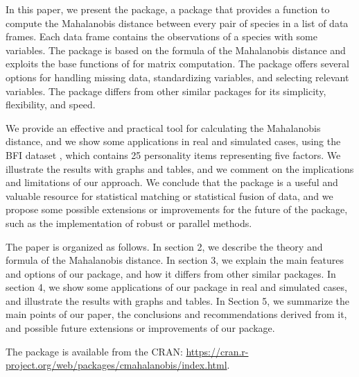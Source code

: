 \documentclass[article]{jss}
\begin{document}
In this paper, we present the  package, a  package that provides a function to compute the Mahalanobis distance between every pair of species in a list of data frames. Each data frame contains the observations of a species with some variables. The  package is based on the formula of the Mahalanobis distance and exploits the base functions of  for matrix computation. The  package offers several options for handling missing data, standardizing variables, and selecting relevant variables. The  package differs from other similar packages for its simplicity, flexibility, and speed.

We provide an effective and practical tool for calculating the Mahalanobis distance, and we show some applications in real and simulated cases, using the BFI dataset \cite{bfi}, which contains 25 personality items representing five factors. We illustrate the results with graphs and tables, and we comment on the implications and limitations of our approach. We conclude that the  package is a useful and valuable resource for statistical matching or statistical fusion of data, and we propose some possible extensions or improvements for the future of the package, such as the implementation of robust or parallel methods.

The paper is organized as follows. In section 2, we describe the theory and formula of the Mahalanobis distance. In section 3, we explain the main features and options of our package, and how it differs from other similar packages. In section 4, we show some applications of our package in real and simulated cases, and illustrate the results with graphs and tables. In Section 5, we summarize the main points of our paper, the conclusions and recommendations derived from it, and possible future extensions or improvements of our package.

The  package is available from the CRAN: \url{https://cran.r-project.org/web/packages/cmahalanobis/index.html}.



\end{document}
